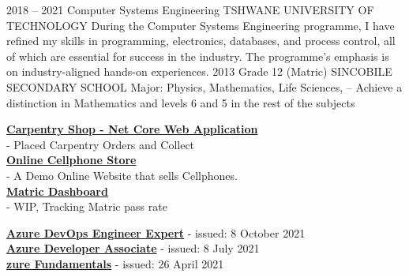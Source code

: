 \documentclass[10pt]{developercv} %
\begin{document}


\begin{entrylist}
	\entry
		{2018 -- 2021}
		{Computer Systems Engineering}
		{TSHWANE UNIVERSITY OF TECHNOLOGY}
		{
            During the Computer Systems Engineering programme, I have refined my skills in
            programming, electronics, databases, and process control, all of which are
            essential for success in the industry. The programme's emphasis is on
            industry-aligned hands-on experiences.
        }
	\entry
		{2013}
        {Grade 12 (Matric)}
		{SINCOBILE SECONDARY SCHOOL}
		{
            Major: Physics, Mathematics, Life Sciences, – Achieve a distinction in Mathematics and levels 6 and 5 in the rest of the subjects
        }
\end{entrylist}


\begin{minipage}[t]{0.5\textwidth}
	\vspace{-\baselineskip} %

	\textbf{\href{http://178.79.147.9:50/}{Carpentry Shop - Net Core Web Application} } \\
    - Placed Carpentry Orders and Collect \\
	\textbf{\href{https://cell-phone-store.netlify.app/}{Online Cellphone Store } } \\
    - A Demo Online Website that sells Cellphones. \\
	\textbf{\href{Matric Dashboard}{Matric Dashboard} } \\
    - WIP, Tracking Matric pass rate

\end{minipage}
\hfill
\begin{minipage}[t]{0.5\textwidth}
	\vspace{-\baselineskip} %

	\textbf{\href{https://www.credly.com/badges/80f2454f-f8de-4e74-9575-a01edf459fde}{Azure DevOps Engineer Expert} } - issued: 8 October 2021\\
	\textbf{\href{https://www.credly.com/badges/2b9449fa-ea3c-4baa-9362-2b1c6f69636e}{Azure Developer Associate} } - issued: 8 July 2021\\
	\textbf{\href{https://www.credly.com/badges/eb7f2969-df90-4138-b898-bcb9f57389e1}{zure Fundamentals} } - issued: 26 April 2021
\end{minipage}
\end{document}
